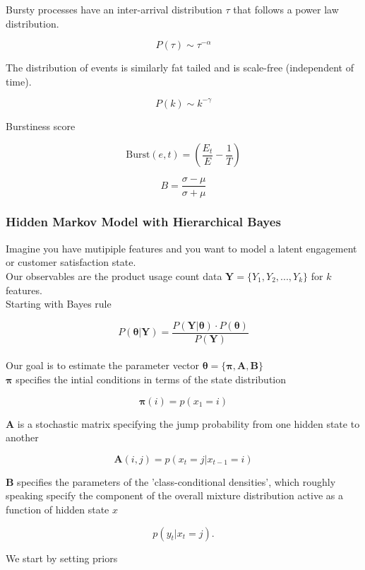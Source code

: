 \documentclass{article}
\begin{document}
Bursty processes have an inter-arrival distribution $\tau$ that follows a power law distribution.

\[
P(\tau) \sim \tau^{-\alpha}
\]

The distribution of events is similarly fat tailed and is scale-free (independent of time).

\[
P(k) \sim k^{-\gamma}
\]


Burstiness score

\[
\text{Burst}(e, t) = \left( \frac{E_{t}}{E} - \frac{1}{T} \right)
\]


\[
B = \frac{\sigma - \mu}{\sigma + \mu}
\]


\subsubsection{Hidden Markov Model with Hierarchical Bayes}

Imagine you have mutipiple features and you want to model a latent engagement or customer satisfaction state. \\

Our observables are the product usage count data $\mathbf{Y} = \{Y_1, Y_2, ..., Y_k\}$ for $k$ features. \\

Starting with Bayes rule

\[
P(\boldsymbol{\theta} | \mathbf{Y}) = \frac{P(\mathbf{Y} | \boldsymbol{\theta}) \cdot P(\boldsymbol{\theta})}{P(\mathbf{Y})}
\] \\

Our goal is to estimate the parameter vector $\boldsymbol{\theta} = \{\boldsymbol{\pi}, \mathbf{A}, \mathbf{B}\}$ \\

$\boldsymbol{\pi}$ specifies the intial conditions in terms of the state distribution

\[
\boldsymbol{\pi}(i) = p(x_1 = i)
\]

$\mathbf{A}$ is a stochastic matrix specifying the jump probability from one hidden state to another

\[
\mathbf{A}(i,j) = p(x_t = j | x_{t-1} = i)
\]


$\mathbf{B}$ specifies the parameters of the 'class-conditional densities', which roughly speaking specify the component of the overall mixture distribution active as a function of hidden state $x$

\[
 p(y_t | x_t = j).
 \]

We start by setting priors
\end{document}
